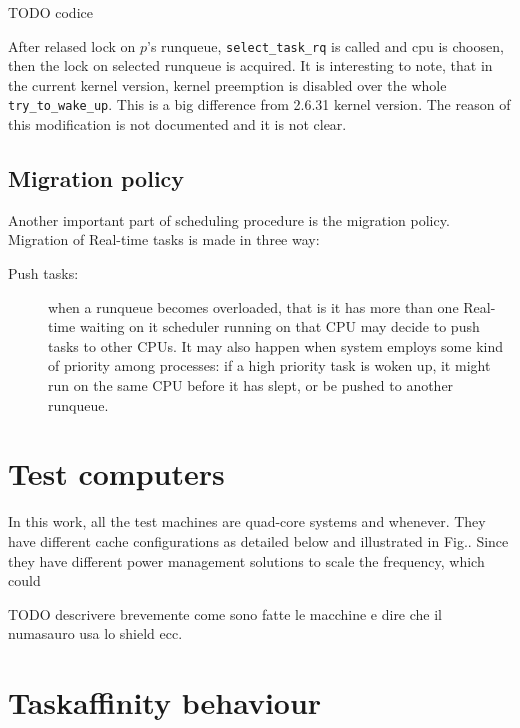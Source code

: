 TODO codice 

After relased lock on $p$'s runqueue, \texttt{select\_task\_rq} is called and cpu is choosen, then the lock on selected runqueue is acquired.
It is interesting to note, that in the current kernel version, kernel preemption is disabled over the whole \texttt{try\_to\_wake\_up}. This is a big 
difference from 2.6.31 kernel version. The reason of this modification is not documented and it is not clear.

\subsection{Migration policy}

Another important part of scheduling procedure is the migration policy. Migration of Real-time tasks is made in three way: 

\begin{description}
\item[Push tasks:] when a runqueue becomes overloaded, that is it has more than one Real-time waiting on it  scheduler running on that CPU may decide to push tasks to other CPUs. It may also happen when system employs some kind of priority among processes: if a high priority task is woken up, it might run on the same CPU before it has slept, or be pushed to 
another runqueue.

\end{description}

\section{Test computers}

In this work, all the test machines are quad-core 
systems and whenever. They have different cache configurations
as detailed below and illustrated in Fig.. Since they have different
power management solutions to scale the frequency, which could

TODO descrivere brevemente come sono fatte le macchine e dire che il numasauro usa lo shield ecc.

\section{Taskaffinity behaviour}

